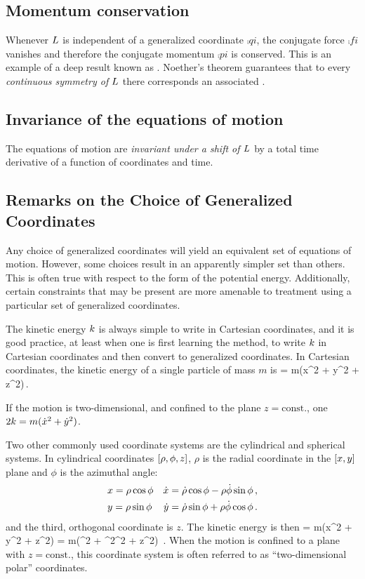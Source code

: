 \subsection{Momentum conservation}
Whenever $L$ is independent of a generalized coordinate $\comp qi$, the conjugate force $\comp fi$ vanishes and therefore the conjugate momentum $\comp pi$ is conserved. This is an example of a deep result known as . Noether's theorem guarantees that to every \emph{continuous symmetry of $L$} there corresponds an associated .


\subsection{Invariance of the equations of motion}
The equations of motion are \emph{invariant under a shift of $L$} by a total time derivative of a function of coordinates and time.


\subsection{Remarks on the Choice of Generalized Coordinates}
Any choice of generalized coordinates will yield an equivalent set of equations of motion. However, some choices result in an apparently simpler set than others. This is often true with respect to the form of the potential energy. Additionally, certain constraints that may be present are more amenable to treatment using a particular set of generalized coordinates.

The kinetic energy $k$ is always simple to write in Cartesian coordinates, and it is good practice, at least when one is first learning the method, to write $k$ in Cartesian coordinates and then convert to generalized coordinates. In Cartesian coordinates, the kinetic energy of a single particle of mass $m$ is
\beq
\ken = m(\dt x^2 + \dt y^2 + \dt z^2)\,.
\eeq

If the motion is two-dimensional, and confined to the plane $z = \text{const.}$, one $2k = m(\dot{x}^2 + \dot{y}^2)$.

Two other commonly used coordinate systems are the cylindrical and spherical systems. In cylindrical coordinates $\left[{\rho, \phi, z}\right]$, $\rho$ is the radial coordinate in the $\left[{x,y}\right]$ plane and $\phi$ is the azimuthal angle:
\begin{align*}
& x = \rho\cos\phi    & \dot{x} = \dot{\rho}\cos\phi - \rho\dot{\phi}\sin\phi \,,\\
& y = \rho\sin\phi    & \dot{y} = \dot{\rho}\sin\phi + \rho\dot{\phi}\cos\phi \,.
\end{align*}
and the third, orthogonal coordinate is $z$. The kinetic energy is then
\beq
\ken = m(\dt x^2 + \dt y^2 + \dt z^2) = m(\dt\rho^2 + \rho^2\dt\phi^2 + \dt z^2) \,.
\eeq
When the motion is confined to a plane with $z = \text{const.}$, this coordinate system is often referred to as ``two-dimensional polar'' coordinates.


